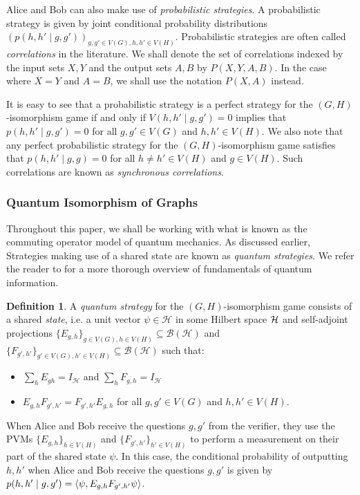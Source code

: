 \documentclass[a4paper,onecolumn,11pt,accepted=2026-01-06]{quantumarticle}
\theoremstyle{plain}
\theoremstyle{remark}
\theoremstyle{definition}
\newtheorem{definition}[thm]{Definition}
\begin{document}
Alice and Bob can also make use of \emph{probabilistic strategies}. A probabilistic strategy is given by joint conditional probability distributions $(p(h,h'\mid g,g'))_{g,g'\in V(G), h,h'\in V(H)}$. Probabilistic strategies are often called \emph{correlations} in the literature. We shall denote the set of correlations indexed by the input sets $X, Y$ and the output sets $A, B$ by $P(X, Y, A, B)$. In  the case where $X = Y$ and $A = B$, we shall use the notation $P(X, A)$ instead. 

It is easy to see that a probabilistic strategy is a perfect strategy for the $(G,H)$-isomorphism game if and only if $V(h,h'\mid g,g') = 0$ implies that $p(h,h'\mid g,g') = 0$ for all $g,g'\in V(G)$ and $h,h' \in V(H)$. We also note that any perfect probabilistic strategy for the $(G,H)$-isomorphism game satisfies that $p(h,h'\mid g,g) = 0$ for all $h \neq h' \in V(H)$ and $g \in V(H)$. Such correlations are known as \emph{synchronous correlations}. 


\subsubsection{Quantum Isomorphism of Graphs}

Throughout this paper, we shall be working with what is known as the commuting operator model of quantum mechanics. As discussed earlier, Strategies making use of a shared state are known as \emph{quantum strategies}.
We refer the reader to \cite{Nielsen_Chuang_2010} for a more thorough overview of fundamentals of quantum information.
\begin{definition}
A \emph{quantum strategy} for the $(G,H)$-isomorphism game consists of a shared \emph{state}, i.e. a unit vector $\psi \in \mathcal{H}$ in some Hilbert space ${\mathcal H}$ and self-adjoint projections $\{E_{g,h}\}_{g\in V(G), h\in V(H)} \subseteq \mathcal{B(H)}$ and $\{F_{g',h'}\}_{g'\in V(G), h'\in V(H)} \subseteq \mathcal{B(H)}$ such that: 
\begin{itemize}
    \item $\sum_{h} E_{gh} = I_{\mathcal{H}}$ and $\sum_{h} F_{g,h} =I_{\mathcal{H}}$ %
    \item $E_{g,h}F_{g',h'} = F_{g',h'}E_{g,h}$ for all $g,g'\in V(G)$ and $h,h'\in V(H)$. 
\end{itemize}

 

When Alice and Bob receive the questions $g,g'$ from the verifier, they use the PVMs $\{E_{g,h}\}_{h\in V(H)}$ and $\{F_{g',h'}\}_{h'\in V(H)}$ to perform a measurement on their part of the shared state $\psi$. In this case, the conditional probability of outputting $h,h'$ when Alice and Bob receive the questions $g,g'$ is given by $p(h,h'\mid g,g') = \braket{\psi, E_{g,h}F_{g',h'} \psi}$. 
\end{definition}
\end{document}
